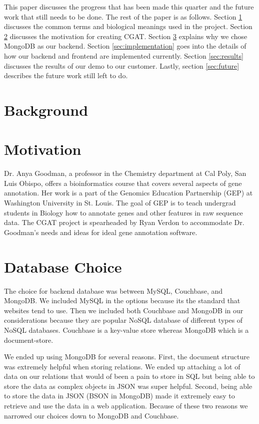 \documentclass[10pt, conference, compsocconf]{IEEEtran}
\begin{document}
This paper discusses the progress that has been made this quarter and the future work that 
still needs to be done. The rest of the paper is as follows. Section \ref{sec:background} discusses
the common terms and biological meanings used in the project. Section \ref{sec:motive} discusses the
motivation for creating CGAT. Section \ref{sec:choice} explains why we chose MongoDB
as our backend. Section \ref{sec:implementation} goes into the details of how
our backend and frontend are implemented currently. Section \ref{sec:results} discusses
the results of our demo to our customer. Lastly, section \ref{sec:future} 
describes the future work still left to do.

\section{Background}\label{sec:background}

\section{Motivation}\label{sec:motive}
Dr. Anya Goodman, a professor in the Chemistry department at Cal Poly, San Luis
Obispo, offers a bioinformatics course that covers several aspects of gene
annotation. Her work is a part of the Genomics Education Partnership (GEP) at 
Washington University in St. Louis.\cite{gep} The goal of GEP is to teach undergrad students
in Biology how to annotate genes and other features in raw sequence data.
The CGAT project is spearheaded by Ryan Verdon to accommodate Dr.
Goodman's needs and ideas for ideal gene annotation software.

\section{Database Choice}\label{sec:choice}
The choice for backend database was between MySQL, Couchbase, and MongoDB.
We included MySQL in the options because its the standard that websites tend to use. Then we included both
Couchbase and MongoDB in our considerations because they are popular NoSQL database of different types of NoSQL
databases. Couchbase is a key-value store whereas MongoDB which is a document-store.

We ended up using MongoDB for several reasons. First, the document structure was extremely helpful when storing
relations. We ended up attaching a lot of data on our relations that would of been a pain to store in SQL but being
able to store the data as complex objects in JSON was super helpful. Second, being able to store the data in JSON
(BSON in MongoDB) made it extremely easy to retrieve and use the data in a web application. Because of these two reasons
we narrowed our choices down to MongoDB and Couchbase. 
\end{document}
